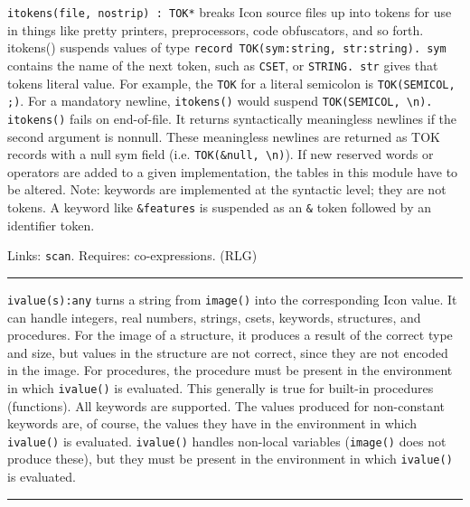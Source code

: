 \texttt{itokens(file, nostrip) : TOK*} breaks Icon source files up into
tokens for use in things like pretty printers, preprocessors, code
obfuscators, and so forth. itokens() suspends values of type
\texttt{record TOK(sym:string, str:string). sym} contains the name of
the next token, such as \texttt{{\textquotedbl}CSET{\textquotedbl}}, or
\texttt{{\textquotedbl}STRING{\textquotedbl}. str} gives that
token{\textquotesingle}s literal value. For example, the \texttt{TOK}
for a literal semicolon is
\texttt{TOK({\textquotedbl}SEMICOL{\textquotedbl},
{\textquotedbl};{\textquotedbl})}. For a mandatory newline,
\texttt{itokens()} would suspend
\texttt{TOK({\textquotedbl}SEMICOL{\textquotedbl},
{\textquotedbl}{\textbackslash}n{\textquotedbl}). itokens()} fails on
end-of-file. It returns syntactically meaningless newlines if the
second argument is nonnull. These meaningless newlines are returned as
TOK records with a null sym field (i.e. \texttt{TOK(\&null,
{\textquotedbl}{\textbackslash}n{\textquotedbl})}). If new reserved
words or operators are added to a given implementation, the tables in
this module have to be altered. Note: keywords are implemented at the
syntactic level; they are not tokens. A keyword like
\texttt{\&features} is suspended as an \texttt{\&} token followed by an
identifier token.

Links: \texttt{scan}. Requires: co-expressions. (RLG)

\vspace{0.25cm}\hrule{}

\texttt{ivalue(s):any} turns a string from \texttt{image()} into the
corresponding Icon value. It can handle integers, real numbers,
strings, csets, keywords, structures, and procedures. For the image of
a structure, it produces a result of the correct type and size, but
values in the structure are not correct, since they are not encoded in
the image. For procedures, the procedure must be present in the
environment in which \texttt{ivalue()} is evaluated. This generally is
true for built-in procedures (functions). All keywords are supported.
The values produced for non-constant keywords are, of course, the
values they have in the environment in which \texttt{ivalue()} is
evaluated. \texttt{ivalue()} handles non-local variables
(\texttt{image()} does not produce these), but they must be present in
the environment in which \texttt{ivalue()} is evaluated. 

\vspace{0.25cm}\hrule{}

